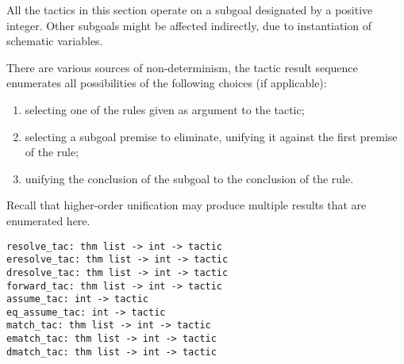 \begin{isabellebody}
\begin{isamarkuptext}
  \medskip All the tactics in this section operate on a subgoal
  designated by a positive integer.  Other subgoals might be affected
  indirectly, due to instantiation of schematic variables.

  There are various sources of non-determinism, the tactic result
  sequence enumerates all possibilities of the following choices (if
  applicable):

  \begin{enumerate}

  \item selecting one of the rules given as argument to the tactic;

  \item selecting a subgoal premise to eliminate, unifying it against
  the first premise of the rule;

  \item unifying the conclusion of the subgoal to the conclusion of
  the rule.

  \end{enumerate}

  Recall that higher-order unification may produce multiple results
  that are enumerated here.%
\end{isamarkuptext}%
\isamarkuptrue%
%
\isadelimmlref
%
\endisadelimmlref
%
\isatagmlref
%
\begin{isamarkuptext}%
\begin{mldecls}
  \verb|resolve_tac: thm list -> int -> tactic| \\
  \verb|eresolve_tac: thm list -> int -> tactic| \\
  \verb|dresolve_tac: thm list -> int -> tactic| \\
  \verb|forward_tac: thm list -> int -> tactic| \\[1ex]
  \verb|assume_tac: int -> tactic| \\
  \verb|eq_assume_tac: int -> tactic| \\[1ex]
  \verb|match_tac: thm list -> int -> tactic| \\
  \verb|ematch_tac: thm list -> int -> tactic| \\
  \verb|dmatch_tac: thm list -> int -> tactic| \\
  \end{mldecls}


\end{isamarkuptext}
\end{isabellebody}
